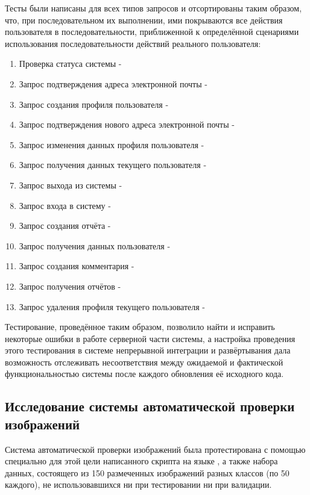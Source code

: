 \tab
Тесты были написаны для всех типов запросов и отсортированы таким образом, что, при последовательном их выполнении, ими покрываются все действия пользователя в последовательности, приближенной к определённой сценариями использования последовательности действий реального пользователя:
\begin{enumerate}
	\item Проверка статуса системы - 
	\item Запрос подтверждения адреса электронной почты - 
	\item Запрос создания профиля пользователя - 
	\item Запрос подтверждения нового адреса электронной почты - 
	\item Запрос изменения данных профиля пользователя - 
	\item Запрос получения данных текущего пользователя - 
	\item Запрос выхода из системы - 
	\item Запрос входа в систему - 
	\item Запрос создания отчёта - 
	\item Запрос получения данных пользователя - 
	\item Запрос создания комментария - 
	\item Запрос получения отчётов - 
	\item Запрос удаления профиля текущего пользователя - 
\end{enumerate}

\tab
Тестирование, проведённое таким образом, позволило найти и исправить некоторые ошибки в работе серверной части системы, а настройка проведения этого тестирования в системе непрерывной интеграции и развёртывания дала возможность отслеживать несоответствия между ожидаемой и фактической функциональностью системы после каждого обновления её исходного кода.

\subsection{Исследование системы автоматической проверки изображений}

\tab
Система автоматической проверки изображений была протестирована с помощью специально для этой цели написанного скрипта на языке , а также набора данных, состоящего из 150 размеченных изображений разных классов (по 50 каждого), не использовавшихся ни при тестировании ни при валидации.

